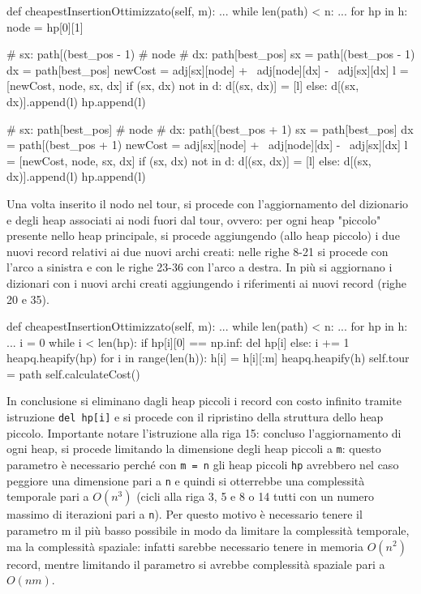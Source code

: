\documentclass[a4paper,12pt]{report}
\begin{document}
\begin{python}
def cheapestInsertionOttimizzato(self, m):
  ...
  while len(path) < n:
    ...
    for hp in h:
      node = hp[0][1]

      # sx: path[(best_pos - 1) %
      # node
      # dx: path[best_pos]
      sx = path[(best_pos - 1) %
      dx = path[best_pos]
      newCost = adj[sx][node] + \
                adj[node][dx] - \
                adj[sx][dx]
      l = [newCost, node, sx, dx]
      if (sx, dx) not in d:
          d[(sx, dx)] = [l]
      else:
        d[(sx, dx)].append(l)
      hp.append(l)

      # sx: path[best_pos]
      # node
      # dx: path[(best_pos + 1) %
      sx = path[best_pos]
      dx = path[(best_pos + 1) %
      newCost = adj[sx][node] + \
                adj[node][dx] - \
                adj[sx][dx]
      l = [newCost, node, sx, dx]
      if (sx, dx) not in d:
        d[(sx, dx)] = [l]
      else:
        d[(sx, dx)].append(l)
      hp.append(l)
\end{python}
Una volta inserito il nodo nel tour, si procede con l'aggiornamento del dizionario e degli heap associati ai nodi fuori dal tour, ovvero: per ogni heap "piccolo" presente nello heap principale, si procede aggiungendo (allo heap piccolo) i due nuovi record relativi ai due nuovi archi creati: nelle righe 8-21 si procede con l'arco a sinistra e con le righe 23-36 con l'arco a destra. In più si aggiornano i dizionari con i nuovi archi creati aggiungendo i riferimenti ai nuovi record (righe 20 e 35).
\begin{python}
def cheapestInsertionOttimizzato(self, m):
  ...
  while len(path) < n:
    ...
    for hp in h:
      ...
      i = 0
      while i < len(hp):
        if hp[i][0] == np.inf:
          del hp[i]
        else:
          i += 1           
      heapq.heapify(hp)
    for i in range(len(h)):
      h[i] = h[i][:m]
    heapq.heapify(h)
  self.tour = path
  self.calculateCost()
\end{python}
In conclusione si eliminano dagli heap piccoli i record con costo infinito tramite istruzione \lstinline!del hp[i]! e si procede con il ripristino della struttura dello heap piccolo. \newline Importante notare l'istruzione alla riga 15: concluso l'aggiornamento di ogni heap, si procede limitando la dimensione degli heap piccoli a \lstinline!m!: questo parametro è necessario perché con \lstinline|m = n| gli heap piccoli \lstinline|hp| avrebbero nel caso peggiore una dimensione pari a \lstinline|n| e quindi si otterrebbe una complessità temporale pari a $O(n^3)$ (cicli alla riga 3, 5 e 8 o 14 tutti con un numero massimo di iterazioni pari a \lstinline|n|). Per questo motivo è necessario tenere il parametro m il più basso possibile in modo da limitare la complessità temporale, ma la complessità spaziale: infatti sarebbe necessario tenere in memoria $O(n^2)$ record, mentre limitando il parametro si avrebbe complessità spaziale pari a $O(nm)$. \newline
\end{document}
